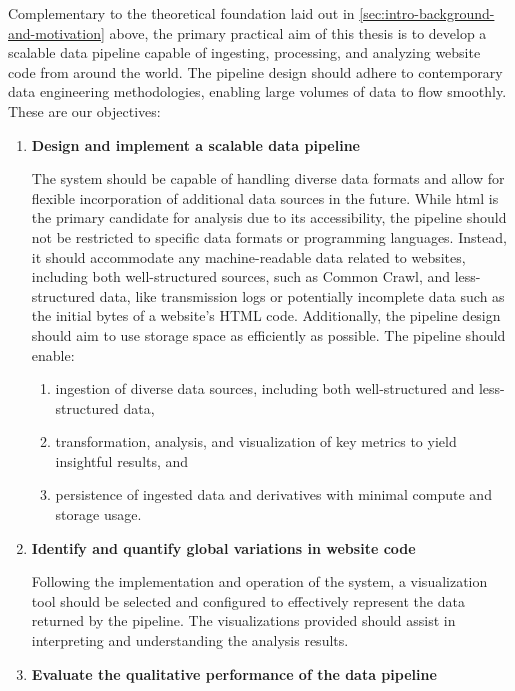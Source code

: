 Complementary to the theoretical foundation laid out in \cref{sec:intro-background-and-motivation} above, the primary practical aim of this thesis is to develop a scalable data pipeline capable of ingesting, processing, and analyzing website code from around the world.
The pipeline design should adhere to contemporary data engineering methodologies, enabling large volumes of data to flow smoothly.
These are our objectives:

\begin{enumerate}
    \item \textbf{Design and implement a scalable data pipeline}

    The system should be capable of handling diverse data formats and allow for flexible incorporation of additional data sources in the future.
    While \ac{html} is the primary candidate for analysis due to its accessibility, the pipeline should not be restricted to specific data formats or programming languages.
    Instead, it should accommodate any machine-readable data related to websites, including both well-structured sources, such as Common Crawl, and less-structured data, like transmission logs or potentially incomplete data such as the initial bytes of a website's HTML code.
    Additionally, the pipeline design should aim to use storage space as efficiently as possible.
    The pipeline should enable:

    \begin{enumerate}
        \item ingestion of diverse data sources, including both well-structured and less-structured data,
        \item transformation, analysis, and visualization of key metrics to yield insightful results, and
        \item persistence of ingested data and derivatives with minimal compute and storage usage.
    \end{enumerate}

    \item \textbf{Identify and quantify global variations in website code}

    Following the implementation and operation of the system, a visualization tool should be selected and configured to effectively represent the data returned by the pipeline.
    The visualizations provided should assist in interpreting and understanding the analysis results.

    \item \textbf{Evaluate the qualitative performance of the data pipeline}


\end{enumerate}
